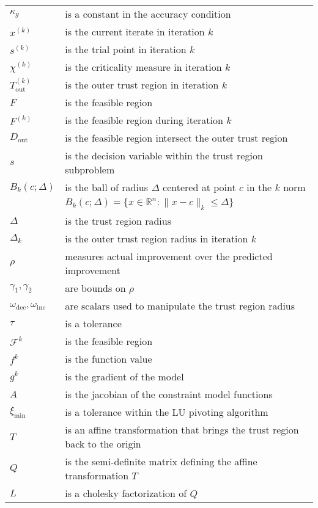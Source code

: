 \documentclass{article}
\theoremstyle{case}
\newcommand{\iteratek}{{x}^{(k)}}
\newcommand{\trialk}{{{s}^{(k)}}}
\newcommand{\outertrk}{{T_{\text{out}}^{(k)}}}
\newcommand{\feasible}{{F}}
\newcommand{\feasiblek}{{F}^{(k)}}
\newcommand{\chik}{{\chi^{(k)}}}
\newcommand{\innerfritr}{D_{\text{in}}}
\newcommand{\outerfritr}{D_{\text{out}}}
\begin{document}
\begin{longtable}{| p{} | p{} |}
$\kappa_{g}$ & is a constant in the accuracy condition \\
$\iteratek$ & is the current iterate in iteration $k$\\
$\trialk$ & is the trial point in iteration $k$ \\
$\chik$ & is the criticality measure in iteration $k$ \\
$\outertrk$ & is the outer trust region in iteration $k$ \\
$\feasible$ & is the feasible region \\
$\feasiblek$ & is the feasible region during iteration $k$ \\
$\outerfritr$ & is the feasible region intersect the outer trust region \\
$s$ & is the decision variable within the trust region subproblem \\
$B_k(c; \Delta)$ & is the ball of radius $\Delta$ centered at point $c$ in the $k$ norm\\
& $B_k(c;\Delta) = \{ x \in \mathbb{R}^n : \| x - c\|_k \le \Delta \}$ \\
$\Delta$ & is the trust region radius \\
$\Delta_k$ & is the outer trust region radius in iteration $k$ \\
$\rho$ & measures actual improvement over the predicted improvement \\
$\gamma_1, \gamma_2$ &  are bounds on $\rho$ \\
$\omega_{\text{dec}}, \omega_{\text{inc}}$ & are scalars used to manipulate the trust region radius \\
$\tau$ & is a tolerance \\
$\mathcal{F}^k$ & is the feasible region \\
$f^k$ & is the function value \\
$g^k$ & is the gradient of the model \\
$A$ & is the jacobian of the constraint model functions \\
$\xi_{\text{min}}$ & is a tolerance within the LU pivoting algorithm \\
$T$ & is an affine transformation that brings the trust region back to the origin \\
$Q$ & is the semi-definite matrix defining the affine transformation $T$ \\
$L$ & is a cholesky factorization of $Q$ \\

\end{longtable}
\end{document}
